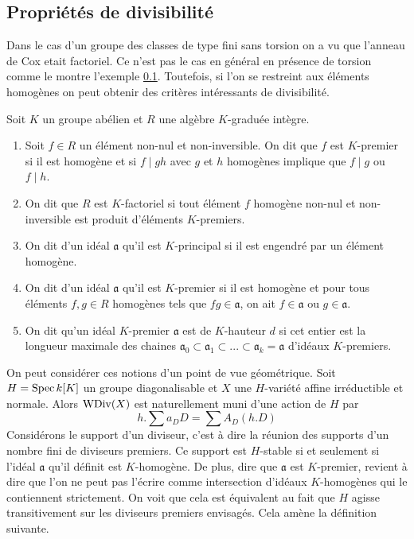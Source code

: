 \subsection{Propriétés de divisibilité}

Dans le cas d'un groupe des classes de type fini sans torsion on a vu que l'anneau de Cox etait factoriel. Ce n'est pas le cas en général en présence de torsion comme le montre l'exemple \ref{}. Toutefois, si l'on se restreint aux éléments homogènes on peut obtenir des critères intéressants de divisibilité. 

\begin{defn}
Soit $K$ un groupe abélien et $R$ une algèbre $K$-graduée intègre.
\begin{enumerate}
\item Soit $f\in R$ un élément non-nul et non-inversible. On dit que $f$ est $K$-premier si il est homogène et si $f\mid gh$ avec $g$ et $h$ homogènes implique que $f\mid g$ ou $f\mid h$.
\item On dit que $R$ est $K$-factoriel si tout élément $f$ homogène non-nul et non-inversible est produit d'éléments $K$-premiers.
\item On dit d'un idéal $\mathfrak{a}$ qu'il est $K$-principal si il est engendré par un élément homogène.
\item On dit d'un idéal $\mathfrak{a}$ qu'il est $K$-premier si il est homogène et pour tous éléments $f,g\in R$ homogènes tels que $fg\in\mathfrak{a}$, on ait $f\in\mathfrak{a}$ ou $g\in\mathfrak{a}$.
\item On dit qu'un idéal $K$-premier $\mathfrak{a}$ est de $K$-hauteur $d$ si cet entier est la longueur maximale des chaines $\mathfrak{a}_0\subset \mathfrak{a}_1\subset ...\subset \mathfrak{a}_k=\mathfrak{a}$ d'idéaux $K$-premiers.
\end{enumerate}
\end{defn}

On peut considérer ces notions d'un point de vue géométrique. Soit $H=\operatorname{Spec} k[K]$ un groupe diagonalisable et $X$ une $H$-variété affine irréductible et normale. Alors $\operatorname{WDiv}(X)$ est naturellement muni d'une action de $H$ par 
$$h.\sum a_DD=\sum A_D(h.D)$$
Considérons le support d'un diviseur, c'est à dire la réunion des supports d'un nombre fini de diviseurs premiers. Ce support est $H$-stable si et seulement si l'idéal $\mathfrak{a}$ qu'il définit est $K$-homogène. De plus, dire que $\mathfrak{a}$ est $K$-premier, revient à dire que l'on ne peut pas l'écrire comme intersection d'idéaux $K$-homogènes qui le contiennent strictement. On voit que cela est équivalent au fait  que $H$ agisse transitivement sur les diviseurs premiers envisagés. Cela amène la définition suivante.

